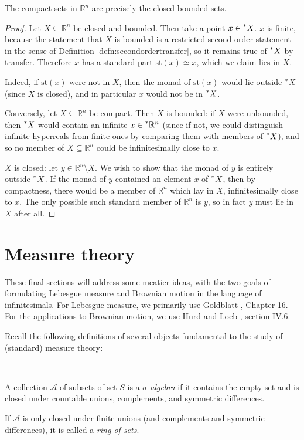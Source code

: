 \documentclass[11pt]{amsart}
\theoremstyle{remark}
\newcommand{\st}{\mathrm{st}}
\newcommand{\hyp}[1][\mathbb{R}]{\prescript{*}{}{#1}}
\newcommand{\near}{\simeq}
\begin{document}
\begin{thm} The compact sets in $\mathbb{R}^n$ are precisely the closed bounded sets.
\end{thm}
\begin{proof}
Let $X \subseteq \mathbb{R}^n$ be closed and bounded.
Then take a point $x \in \hyp[X]$.
$x$ is finite, because the statement that $X$ is bounded is a restricted second-order statement in the sense of Definition \ref{defn:secondordertransfer}, so it remains true of $\hyp[X]$ by transfer.
Therefore $x$ has a standard part $\st(x) \near x$, which we claim lies in $X$.

Indeed, if $\st(x)$ were not in $X$, then the monad of $\st(x)$ would lie outside $\hyp[X]$ (since $X$ is closed), and in particular $x$ would not be in $\hyp[X]$.

Conversely, let $X \subseteq \mathbb{R}^n$ be compact.
Then $X$ is bounded: if $X$ were unbounded, then $\hyp[X]$ would contain an infinite $x \in \hyp[\mathbb{R}^n]$ (since if not, we could distinguish infinite hyperreals from finite ones by comparing them with members of $\hyp[X]$), and so no member of $X \subseteq \mathbb{R}^n$ could be infinitesimally close to $x$.

$X$ is closed: let $y \in \mathbb{R}^n \setminus X$.
We wish to show that the monad of $y$ is entirely outside $\hyp[X]$.
If the monad of $y$ contained an element $x$ of $\hyp[X]$, then by compactness, there would be a member of $\mathbb{R}^n$ which lay in $X$, infinitesimally close to $x$.
The only possible such standard member of $\mathbb{R}^n$ is $y$, so in fact $y$ must lie in $X$ after all.
\end{proof}

\section{Measure theory}
These final sections will address some meatier ideas, with the two goals of formulating Lebesgue measure and Brownian motion in the language of infinitesimals.
For Lebesgue measure, we primarily use Goldblatt \cite{goldblatt}, Chapter 16.
For the applications to Brownian motion, we use Hurd and Loeb \cite{hurdloeb}, section IV.6.

Recall the following definitions of several objects fundamental to the study of (standard) measure theory:

\

\begin{defn} A collection $\mathcal{A}$ of subsets of set $S$ is a \emph{$\sigma$-algebra} if it contains the empty set and is closed under countable unions, complements, and symmetric differences.

If $\mathcal{A}$ is only closed under finite unions (and complements and symmetric differences), it is called a \emph{ring of sets}.
\end{defn}
\end{document}
